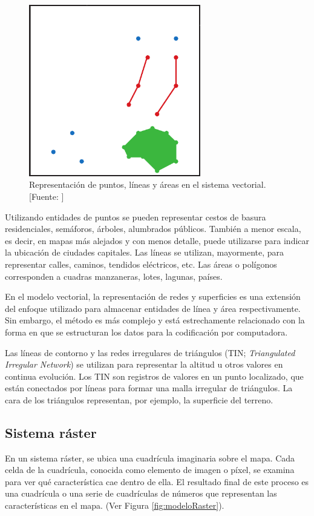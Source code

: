 \begin{figure}[H]
    \centering
    \includegraphics[width=7.5cm]{modeloVectorial.png}
    \caption{Representación de puntos, líneas y áreas en el sistema vectorial. [Fuente: ]}
    \label{fig:modeloVectorial}
\end{figure}

Utilizando entidades de puntos se pueden representar cestos de basura residenciales, semáforos, árboles, alumbrados públicos. También a menor escala, es decir, en mapas más alejados y con menos detalle, puede utilizarse para indicar la ubicación de ciudades capitales. Las líneas se utilizan, mayormente, para representar calles, caminos, tendidos eléctricos, etc. Las áreas o polígonos corresponden a cuadras manzaneras, lotes, lagunas, países.

En el modelo vectorial, la representación de redes y superficies es una extensión del enfoque utilizado para almacenar entidades de línea y área respectivamente. Sin embargo, el método es más complejo y está estrechamente relacionado con la forma en que se estructuran los datos para la codificación por computadora.

Las líneas de contorno y las redes irregulares de triángulos (TIN; \textit{Triangulated Irregular Network}) se utilizan para representar la altitud u otros valores en continua evolución. Los TIN son registros de valores en un punto localizado, que están conectados por líneas para formar una malla irregular de triángulos. La cara de los triángulos representan, por ejemplo, la superficie del terreno.

\subsection{Sistema ráster}

En un sistema ráster, se ubica una cuadrícula imaginaria sobre el mapa. Cada celda de la cuadrícula, conocida como elemento de imagen o píxel, se examina para ver qué característica cae dentro de ella. El resultado final de este proceso es una cuadrícula o una serie de cuadrículas de números que representan las características en el mapa. (Ver Figura \ref{fig:modeloRaster}).

